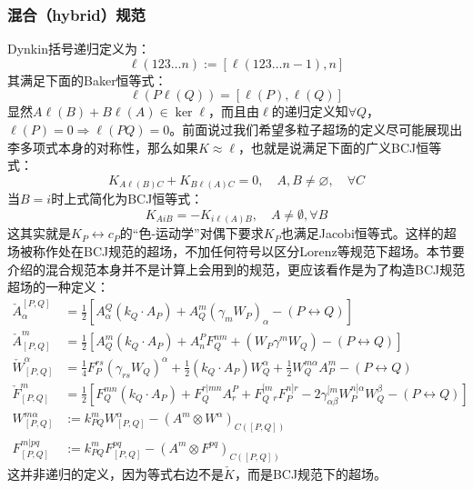\subsubsection{混合（hybrid）规范}
Dynkin括号递归定义为：
\begin{equation}
	\ell(123\ldots n):=[\ell(123\ldots n-1),n]
\end{equation}
其满足下面的Baker恒等式：
\begin{equation}
	\ell(P\ell(Q))=[\ell(P),\ell(Q)]
\end{equation}
显然$A\ell(B)+B\ell(A)\in\ker\ell$，而且由$\ell$的递归定义知$\forall Q$，$\ell(P) = 0\Rightarrow \ell(PQ)=0$。前面说过我们希望多粒子超场的定义尽可能展现出李多项式本身的对称性，那么如果$K\approx \ell$，也就是说满足下面的广义BCJ恒等式：
\begin{equation}
	\label{eq:6.38}
	K_{A\ell(B)C}+K_{B\ell(A)C}=0,\quad A,B\neq\varnothing,\quad\forall C
\end{equation}
当$B=i$时上式简化为BCJ恒等式：
\begin{equation}
	\label{eq:6.39}
	K_{AiB}=-K_{i\ell(A)B},\quad A\neq\emptyset,\forall B
\end{equation}
这其实就是$K_P\leftrightarrow c_P$的“色-运动学”对偶下要求$K_P$也满足Jacobi恒等式。这样的超场被称作处在BCJ规范的超场，不加任何符号以区分Lorenz等规范下超场。本节要介绍的混合规范本身并不是计算上会用到的规范，更应该看作是为了构造BCJ规范超场的一种定义：
\begin{equation}
	\begin{aligned}
		\check{A}_\alpha^{[P,  {Q}]}&=\frac{1}{2}[A_\alpha^  {Q}(k_Q\cdot A_P)+A_Q^m(\gamma_mW_P)_\alpha-(P\leftrightarrow Q)]
		\\\check{A}_{[P,  {Q}]}^m&=\frac{1}{2}[A_Q^m(k_Q\cdot A_P)+A_n^PF_Q^{nm}+(W_P\gamma^mW_Q)-(P\leftrightarrow Q)]\\
		\check{W}_{[P,  {Q}]}^\alpha&=\frac{1}{4}F_P^{rs}(\gamma_{rs}W_Q)^\alpha+\frac{1}{2}(k_Q\cdot A_P)W_Q^\alpha+\frac{1}{2}W_Q^{m\alpha}A_P^m-(P\leftrightarrow Q)\\
		\check{F}_{[P,  {Q}]}^m&=\frac{1}{2}{\left[F_Q^{mn}(k_Q\cdot A_P)+F_Q^{r|mn}A_r^P+F_Q^{[m}{}_rF_P^{n]r}-2\gamma_{\alpha\beta}^{[m}W_P^{n]\alpha}W_Q^\beta-(P\leftrightarrow Q)\right]}\\
		W_{[P,Q]}^{m\alpha}&:=k_{PQ}^mW_{[P,Q]}^\alpha-(A^m\otimes W^\alpha)_{C([P,Q])}\\
		F_{[P,Q]}^{m|pq}&:=k_{PQ}^mF_{[P,Q]}^{pq}-(A^m\otimes F^{pq})_{C([P,Q])}
	\end{aligned}
\end{equation}
这并非递归的定义，因为等式右边不是$\check K$，而是BCJ规范下的超场。
